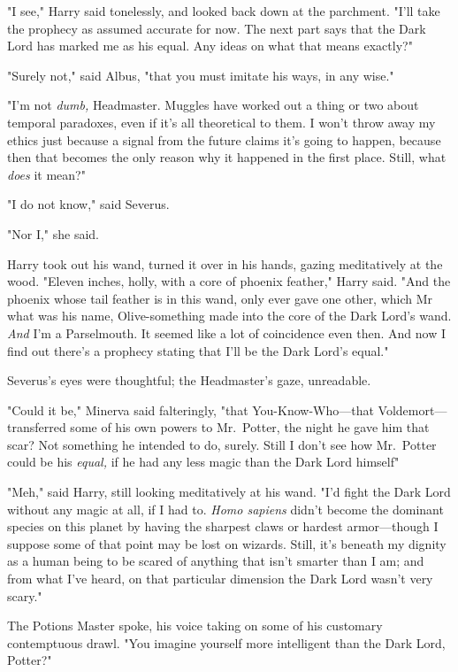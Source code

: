 "I see," Harry said tonelessly, and looked back down at the parchment. "I'll
take the prophecy as assumed accurate for now. The next part says that the Dark
Lord has marked me as his equal. Any ideas on what that means exactly?"

"Surely not," said Albus, "that you must imitate his ways, in any wise."

"I'm not \emph{dumb,} Headmaster. Muggles have worked out a thing or two about
temporal paradoxes, even if it's all theoretical to them. I won't throw away my
ethics just because a signal from the future claims it's going to happen,
because then that becomes the only reason why it happened in the first place.
Still, what \emph{does} it mean?"

"I do not know," said Severus.

"Nor I," she said.

Harry took out his wand, turned it over in his hands, gazing meditatively at
the wood. "Eleven inches, holly, with a core of phoenix feather," Harry said.
"And the phoenix whose tail feather is in this wand, only ever gave one other,
which Mr{\el} what was his name, Olive-something{\el} made into the core
of the Dark Lord's wand. \emph{And} I'm a Parselmouth. It seemed like a lot of
coincidence even then. And now I find out there's a prophecy stating that I'll
be the Dark Lord's equal."

Severus's eyes were thoughtful; the Headmaster's gaze, unreadable.

"Could it be," Minerva said falteringly, "that You-Know-Who—that
Voldemort—transferred some of his own powers to Mr.~Potter, the night he gave
him that scar? Not something he intended to do, surely. Still{\el} I don't
see how Mr.~Potter could be his \emph{equal,} if he had any less magic than the
Dark Lord himself{\el}"

"Meh," said Harry, still looking meditatively at his wand. "I'd fight the Dark
Lord without any magic at all, if I had to. \emph{Homo sapiens} didn't become
the dominant species on this planet by having the sharpest claws or hardest
armor—though I suppose some of that point may be lost on wizards. Still, it's
beneath my dignity as a human being to be scared of anything that isn't smarter
than I am; and from what I've heard, on that particular dimension the Dark Lord
wasn't very scary."

The Potions Master spoke, his voice taking on some of his customary
contemptuous drawl. "You imagine yourself more intelligent than the Dark Lord,
Potter?"


